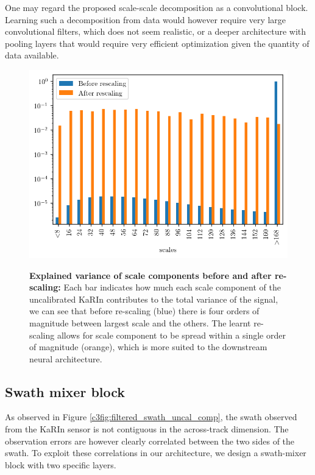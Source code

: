 \begin{bibunit}
One may regard the proposed scale-scale decomposition as a convolutional block. Learning such a decomposition from data would however require very large convolutional filters, which does not seem 
realistic, or a deeper architecture with pooling layers that would require very efficient optimization given the quantity of data available. 
\begin{figure}[!t]%
    \centering
    {\includegraphics[width=\linewidth]{00_Calib/var_rescale_obs} }%
    \caption{\textbf{Explained variance of scale components before and after re-scaling:} Each bar indicates how much each scale component of the uncalibrated KaRIn contributes to the total variance of the signal, we can see that before re-scaling (blue) there is four orders of magnitude between largest scale and the others. The learnt re-scaling allows for scale component to be spread within a single order of magnitude (orange), which is more suited to the downstream neural architecture.}%
    \label{c3fig:var_in_out}%
\end{figure}


\subsection*{Swath mixer block}
\label{c3subsec:mixing}

As observed in Figure \ref{c3fig:filtered_swath_uncal_comp}, the swath observed from the KaRIn sensor is not contiguous in the across-track dimension. The observation errors are however clearly correlated between the two sides of the swath. To exploit these correlations in our architecture, we design a swath-mixer block with two specific layers. 


\end{bibunit}
